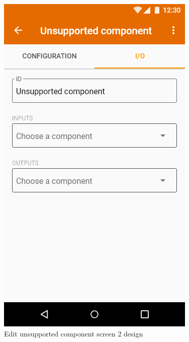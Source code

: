 \begin{figure}
\begin{minipage}[b]{0.32\textwidth}
    	\includegraphics[width=\textwidth]{pics/xd/Edit unsupported component - io.png}
    	\caption[Edit unsupported component screen 2]{Edit unsupported component screen 2 design}\label{fig:xdEditUnsupportedComponent2}
    \end{minipage}
\end{figure}